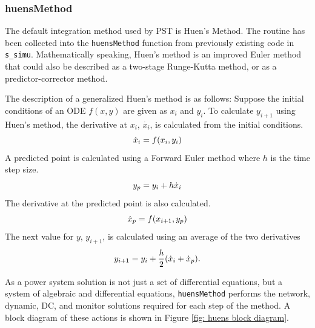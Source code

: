 
\subsubsection{huensMethod}  
The default integration method used by PST is Huen's Method.
The routine has been collected into the \verb|huensMethod| function from previously existing code in \verb|s_simu|.
Mathematically speaking, Huen's method is an improved Euler method that could also be described as a two-stage Runge-Kutta method, or as a predictor-corrector method.

The description of a generalized Huen's method is as follows:
Suppose the initial conditions of an ODE $f(x,y)$ are given as $x_i$ and $y_i$.
To calculate $y_{i+1}$ using Huen's method, the derivative at $x_i$, $\dot{x_i}$, is calculated from the initial conditions.
\begin{equation}{\label{eq: huens1} }
\dot{x}_i = f(x_i, y_i)
\end{equation} 
\noindent A predicted point is calculated using a Forward Euler method where $h$ is the time step size.
\begin{equation}{\label{eq: huens2} }
y_p = y_i + h \dot{x}_i
\end{equation} 
\noindent The derivative at the predicted point is also calculated.
\begin{equation}{\label{eq: huens3} }
\dot{x}_p = f(x_{i+1}, y_p)
\end{equation} 
\noindent The next value for $y$, $y_{i+1}$, is calculated using an average of the two derivatives
\begin{equation}{\label{eq: huens4} }
y_{i+1} = y_i + \frac{h}{2}( \dot{x}_i + \dot{x}_p ).
\end{equation} 


As a power system solution is not just a set of differential equations, but a system of algebraic and differential equations,
\verb|huensMethod| performs the network, dynamic, DC, and monitor solutions required for each step of the method.
A block diagram of these actions is shown in Figure \ref{fig: huens block diagram}.

